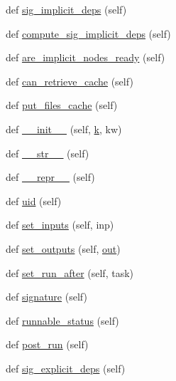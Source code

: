 \begin{DoxyCompactItemize}
\item 
def \hyperlink{classwaflib_1_1_task_1_1_task_a60ce159ef323481b09fcea4decb9e231}{sig\+\_\+implicit\+\_\+deps} (self)
\item 
def \hyperlink{classwaflib_1_1_task_1_1_task_adf3f63ea77fbca592ebc4244ba57887d}{compute\+\_\+sig\+\_\+implicit\+\_\+deps} (self)
\item 
def \hyperlink{classwaflib_1_1_task_1_1_task_a89612661d2073f53f62d7306a6c2238d}{are\+\_\+implicit\+\_\+nodes\+\_\+ready} (self)
\item 
def \hyperlink{classwaflib_1_1_task_1_1_task_a2085cfed25d49bed519af381621b29e7}{can\+\_\+retrieve\+\_\+cache} (self)
\item 
def \hyperlink{classwaflib_1_1_task_1_1_task_adf5e108580503738b2ab58eb1b56c10f}{put\+\_\+files\+\_\+cache} (self)
\item 
def \hyperlink{classwaflib_1_1_task_1_1_task_a566ab609bec4499aeab7bcd6f77f156e}{\+\_\+\+\_\+init\+\_\+\+\_\+} (self, \hyperlink{rfft2d_test_m_l_8m_adc468c70fb574ebd07287b38d0d0676d}{k}, kw)
\item 
def \hyperlink{classwaflib_1_1_task_1_1_task_a2507ae71718d699910a9dd8708664630}{\+\_\+\+\_\+str\+\_\+\+\_\+} (self)
\item 
def \hyperlink{classwaflib_1_1_task_1_1_task_ac05a045661750df307593224089759da}{\+\_\+\+\_\+repr\+\_\+\+\_\+} (self)
\item 
def \hyperlink{classwaflib_1_1_task_1_1_task_a910c51ea67c1c47ac40690bbba73b76a}{uid} (self)
\item 
def \hyperlink{classwaflib_1_1_task_1_1_task_a647c971bbca84d07daeff8d24f70ea18}{set\+\_\+inputs} (self, inp)
\item 
def \hyperlink{classwaflib_1_1_task_1_1_task_a8e650ed64c8370720574ebd8481a4f48}{set\+\_\+outputs} (self, \hyperlink{latency_8c_a71fd1c281affec034757279e4f91c50b}{out})
\item 
def \hyperlink{classwaflib_1_1_task_1_1_task_a84292828c5a6cf3282027ed8ce5c7822}{set\+\_\+run\+\_\+after} (self, task)
\item 
def \hyperlink{classwaflib_1_1_task_1_1_task_a48e55f13de8172b779a4e63794c7f44f}{signature} (self)
\item 
def \hyperlink{classwaflib_1_1_task_1_1_task_a2a281aaea77a0732f72103cfe4bc56c4}{runnable\+\_\+status} (self)
\item 
def \hyperlink{classwaflib_1_1_task_1_1_task_ac7c2e0bf22acd7d96399b1ca7f342232}{post\+\_\+run} (self)
\item 
def \hyperlink{classwaflib_1_1_task_1_1_task_a76a53025fb59fd6096f988ff64481070}{sig\+\_\+explicit\+\_\+deps} (self)

\end{DoxyCompactItemize}
